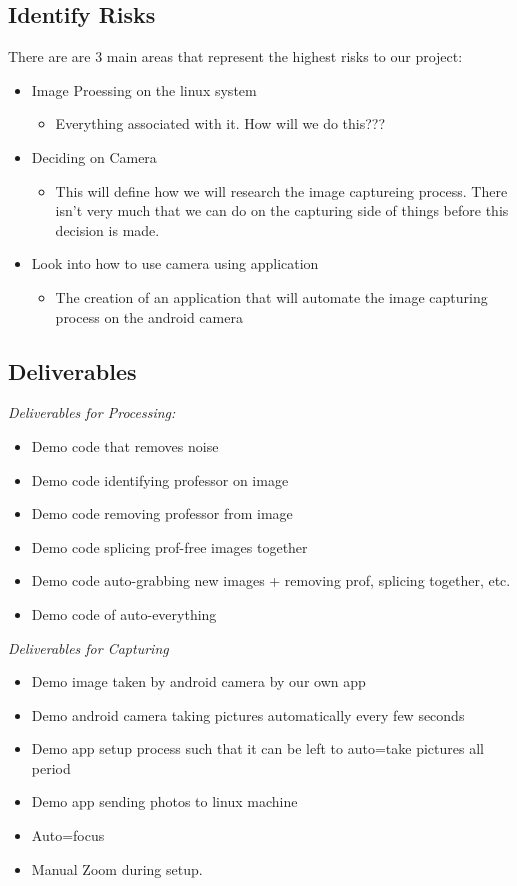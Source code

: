 \documentclass[]{article}
\begin{document}
		\subsection{Identify Risks}
		There are are 3 main areas that represent the highest risks to our project:
			\begin{itemize}
				\item Image Proessing on the linux system
				\begin{itemize}
					\item Everything associated with it. How will we do this???
				\end{itemize}
				\item Deciding on Camera
				\begin{itemize}
					\item This will define how we will research the image captureing process. There isn't very much that we can do on the capturing side of things before this decision is made.
				\end{itemize}
				\item Look into how to use camera using application
				\begin{itemize}
					\item The creation of an application that will automate the image capturing process on the android camera
				\end{itemize}
			\end{itemize}
		\subsection{Deliverables}
			\emph{Deliverables for Processing:}
			\begin{itemize}
				\item Demo code that removes noise
				\item Demo code identifying professor on image
				\item Demo code removing professor from image
				\item Demo code splicing prof-free images together
				\item Demo code auto-grabbing new images + removing prof, splicing together, etc.
				\item Demo code of auto-everything
			\end{itemize}
			\emph{Deliverables for Capturing}
			\begin{itemize}
				\item Demo image taken by android camera by our own app
				\item Demo android camera taking pictures automatically every few seconds
				\item Demo app setup process such that it can be left to auto=take pictures all period
				\item Demo app sending photos to linux machine
				\item Auto=focus
				\item Manual Zoom during setup.
			\end{itemize}
		
\end{document}
